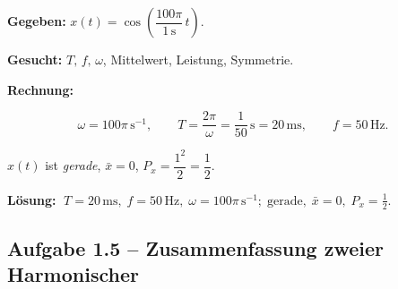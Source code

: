 \begin{beispiel}

\textbf{Gegeben:} $x(t) = \cos\!\left(\dfrac{100\pi}{1\,\mathrm{s}}\,t\right)$.

\textbf{Gesucht:} $T,\, f,\, \omega$, Mittelwert, Leistung, Symmetrie.

\textbf{Rechnung:}

$$
\omega = 100\pi\,\mathrm{s}^{-1}, \qquad
T = \frac{2\pi}{\omega} = \frac{1}{50}\,\mathrm{s} = 20\,\mathrm{ms}, \qquad
f = 50\,\mathrm{Hz}.
$$

$x(t)$ ist \emph{gerade}, $\bar{x} = 0$, $P_x = \dfrac{1^2}{2} = \dfrac{1}{2}$.

\begin{center}
\end{center}

\textbf{Lösung:}
$\boxed{\;T = 20\,\mathrm{ms},\; f = 50\,\mathrm{Hz},\;
\omega = 100\pi\,\mathrm{s}^{-1};\; \text{gerade},\;
\bar{x} = 0,\; P_x = \tfrac12.\;}$

\end{beispiel}

\subsection*{Aufgabe 1.5 – Zusammenfassung zweier Harmonischer}

